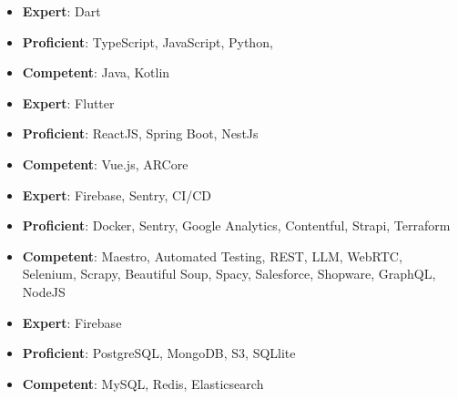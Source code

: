 









{
\quad
\begin{itemize}
\item  \textbf{Expert}: Dart
\item  \textbf{Proficient}: TypeScript, JavaScript, Python, 
\item  \textbf{Competent}: Java, Kotlin
\end{itemize}
}

\vspace{1em}

{
\quad
\begin{itemize}
\item  \textbf{Expert}: Flutter
\item  \textbf{Proficient}: ReactJS, Spring Boot, NestJs
\item  \textbf{Competent}: Vue.js, ARCore
\end{itemize}
}

\vspace{1em}

{
\quad
\begin{itemize}
\item  \textbf{Expert}: Firebase, Sentry, CI/CD
\item  \textbf{Proficient}: Docker, Sentry, Google Analytics, Contentful, Strapi, Terraform
\item  \textbf{Competent}: Maestro, Automated Testing, REST, LLM, WebRTC, Selenium, Scrapy, Beautiful Soup, Spacy, Salesforce, Shopware, GraphQL, NodeJS
\end{itemize}
}

\vspace{1em}

{
\quad
\begin{itemize}
\item  \textbf{Expert}: Firebase
\item  \textbf{Proficient}: PostgreSQL, MongoDB, S3, SQLlite
\item  \textbf{Competent}: MySQL, Redis, Elasticsearch
\end{itemize}
}




